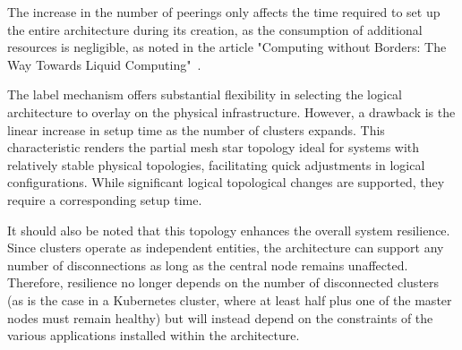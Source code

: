 The increase in the number of peerings only affects the time required to set up the entire architecture during its creation, as the consumption of additional resources is negligible, as noted in the article "Computing without Borders: The Way Towards Liquid Computing"~\cite{s2-1}.

The label mechanism offers substantial flexibility in selecting the logical architecture to overlay on the physical infrastructure. However, a drawback is the linear increase in setup time as the number of clusters expands. This characteristic renders the partial mesh star topology ideal for systems with relatively stable physical topologies, facilitating quick adjustments in logical configurations. While significant logical topological changes are supported, they require a corresponding setup time.

It should also be noted that this topology enhances the overall system resilience. Since clusters operate as independent entities, the architecture can support any number of disconnections as long as the central node remains unaffected. Therefore, resilience no longer depends on the number of disconnected clusters (as is the case in a Kubernetes cluster, where at least half plus one of the master nodes must remain healthy) but will instead depend on the constraints of the various applications installed within the architecture.
